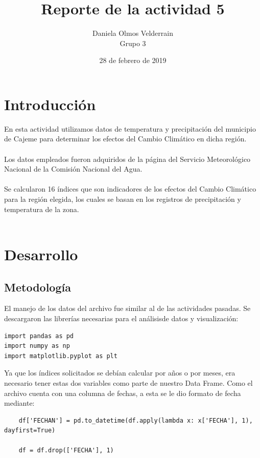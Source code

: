 \documentclass[letterpaper,12pt]{article}
\begin{document}
\title{Reporte de la actividad 5}
\author{Daniela Olmos Velderrain\\Grupo 3}
\date{28 de febrero de 2019}

\maketitle

\section{Introducción}
En esta actividad utilizamos datos de temperatura y precipitación del municipio de Cajeme para determinar los efectos del Cambio Climático en dicha región.
\\
\\
Los datos empleados fueron adquiridos de la página del Servicio Meteorológico Nacional de la Comisión Nacional del Agua.
\\
\\
Se calcularon 16 índices que son indicadores de los efectos del Cambio Climático para la región elegida, los cuales se basan en los registros de precipitación y temperatura de la zona. 
\\
\\
\section{Desarrollo}
\subsection{Metodología} 
El manejo de los datos del archivo fue similar al de las actividades pasadas. Se descargaron las librerías necesarias para el análisisde datos y visualización:

\begin{verbatim}
import pandas as pd
import numpy as np
import matplotlib.pyplot as plt
\end{verbatim}

Ya que los índices solicitados se debían calcular por años o por meses, era necesario tener estas dos variables como parte de nuestro Data Frame. Como el archivo cuenta con una columna de fechas, a esta se le dio formato de fecha mediante:
\begin{verbatim}
    df['FECHAN'] = pd.to_datetime(df.apply(lambda x: x['FECHA'], 1), dayfirst=True)
    
    df = df.drop(['FECHA'], 1)
\end{verbatim}
\end{document}
